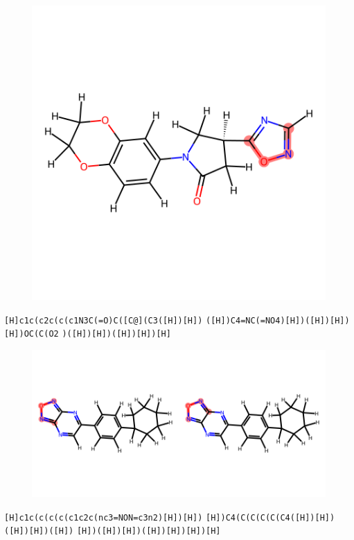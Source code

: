 \documentclass{article}
\begin{document}
\begin{figure}[ht]
\centering
    \includegraphics{mol86.png}
\end{figure}
\verb|[H]c1c(c2c(c(c1N3C(=O)C([C@](C3([H])[H])| \verb|([H])C4=NC(=NO4)[H])([H])[H])[H])OC(C(O2| \verb|)([H])[H])([H])[H])[H]|

\begin{figure}[ht]
\centering
    \includegraphics{mol87.png}
\end{figure}
\verb|[H]c1c(c(c(c(c1c2c(nc3=NON=c3n2)[H])[H])| \verb|[H])C4(C(C(C(C(C4([H])[H])([H])[H])([H])| \verb|[H])([H])[H])([H])[H])[H])[H]|
\end{document}
